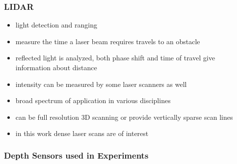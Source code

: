 \subsubsection{LIDAR}

\begin{itemize}
    \item light detection and ranging
    \item measure the time a laser beam requires travels to an obstacle
    \item reflected light is analyzed, both phase shift and time of travel give information about distance
    \item intensity can be measured by some laser scanners as well
    \item broad spectrum of application in various disciplines
    \item can be full resolution 3D scanning or provide vertically sparse scan lines
    \item in this work dense laser scans are of interest
\end{itemize}

\subsubsection{Depth Sensors used in Experiments}

\begin{tabular}
\begin{table}
    
    \caption[List of tested depth sensors]{This table lists all depth sensors that are tested during the master thesis. Not all of them give in usable results for the intended feature-based registration.}
\end{table}
\end{tabular}
